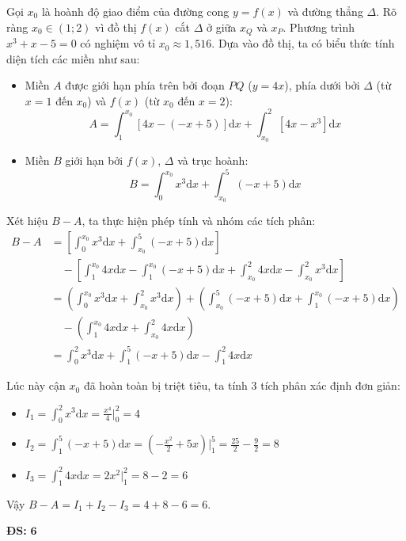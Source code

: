 \begin{ex}
{		Gọi $x_0$ là hoành độ giao điểm của đường cong $y=f(x)$ và đường thẳng $\Delta$. 
		Rõ ràng $x_0 \in (1; 2)$ vì đồ thị $f(x)$ cắt $\Delta$ ở giữa $x_Q$ và $x_P$. Phương trình $x^3 + x - 5 = 0$ có nghiệm vô tỉ $x_0 \approx 1,516$.
		Dựa vào đồ thị, ta có biểu thức tính diện tích các miền như sau:
		\begin{itemize}
			\item Miền $A$ được giới hạn phía trên bởi đoạn $PQ$ ($y=4x$), phía dưới bởi $\Delta$ (từ $x=1$ đến $x_0$) và $f(x)$ (từ $x_0$ đến $x=2$):
			$$A = \int_{1}^{x_0} \left[ 4x - (-x + 5) \right] \text{d}x + \int_{x_0}^{2} \left[ 4x - x^3 \right] \text{d}x$$
			\item Miền $B$ giới hạn bởi $f(x)$, $\Delta$ và trục hoành:
			$$B = \int_{0}^{x_0} x^3 \text{d}x + \int_{x_0}^{5} (-x + 5) \text{d}x$$
		\end{itemize}
		
		Xét hiệu $B - A$, ta thực hiện phép tính và nhóm các tích phân:
		\begin{align*}
		B - A &= \left[ \int_{0}^{x_0} x^3 \text{d}x + \int_{x_0}^{5} (-x + 5) \text{d}x \right] \\
		&\quad - \left[ \int_{1}^{x_0} 4x \text{d}x - \int_{1}^{x_0} (-x + 5) \text{d}x + \int_{x_0}^{2} 4x \text{d}x - \int_{x_0}^{2} x^3 \text{d}x \right] \\
		&= \left( \int_{0}^{x_0} x^3 \text{d}x + \int_{x_0}^{2} x^3 \text{d}x \right) + \left( \int_{x_0}^{5} (-x + 5) \text{d}x + \int_{1}^{x_0} (-x + 5) \text{d}x \right) \\
		&\quad - \left( \int_{1}^{x_0} 4x \text{d}x + \int_{x_0}^{2} 4x \text{d}x \right) \\
		&= \int_{0}^{2} x^3 \text{d}x + \int_{1}^{5} (-x + 5) \text{d}x - \int_{1}^{2} 4x \text{d}x
		\end{align*}
		
		Lúc này cận $x_0$ đã hoàn toàn bị triệt tiêu, ta tính 3 tích phân xác định đơn giản:
		\begin{itemize}
			\item $I_1 = \int_{0}^{2} x^3 \text{d}x = \frac{x^4}{4} \bigg|_{0}^{2} = 4$
			\item $I_2 = \int_{1}^{5} (-x + 5) \text{d}x = \left( -\frac{x^2}{2} + 5x \right) \bigg|_{1}^{5} = \frac{25}{2} - \frac{9}{2} = 8$
			\item $I_3 = \int_{1}^{2} 4x \text{d}x = 2x^2 \bigg|_{1}^{2} = 8 - 2 = 6$
		\end{itemize}
		Vậy $B - A = I_1 + I_2 - I_3 = 4 + 8 - 6 = 6$.
		
		\textbf{ĐS: } $\boldsymbol{6}$
	}
\end{ex}
